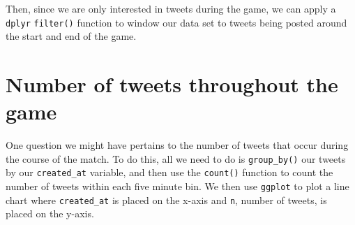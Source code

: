\documentclass[]{book}
\newenvironment{Shaded}{\begin{snugshade}}{\end{snugshade}}
\newcommand{\DataTypeTok}[1]{\textcolor[rgb]{0.13,0.29,0.53}{#1}}
\newcommand{\KeywordTok}[1]{\textcolor[rgb]{0.13,0.29,0.53}{\textbf{#1}}}
\newcommand{\NormalTok}[1]{#1}
\newcommand{\OperatorTok}[1]{\textcolor[rgb]{0.81,0.36,0.00}{\textbf{#1}}}
\newcommand{\StringTok}[1]{\textcolor[rgb]{0.31,0.60,0.02}{#1}}
\begin{document}
Then, since we are only interested in tweets during the game, we can apply a \texttt{dplyr} \texttt{filter()} function to window our data set to tweets being posted around the start and end of the game.

\begin{Shaded}
\end{Shaded}

\hypertarget{number-of-tweets-throughout-the-game}{%
\section{Number of tweets throughout the game}\label{number-of-tweets-throughout-the-game}}

One question we might have pertains to the number of tweets that occur during the course of the match. To do this, all we need to do is \texttt{group\_by()} our tweets by our \texttt{created\_at} variable, and then use the \texttt{count()} function to count the number of tweets within each five minute bin. We then use \texttt{ggplot} to plot a line chart where \texttt{created\_at} is placed on the x-axis and \texttt{n}, number of tweets, is placed on the y-axis.
\end{document}

